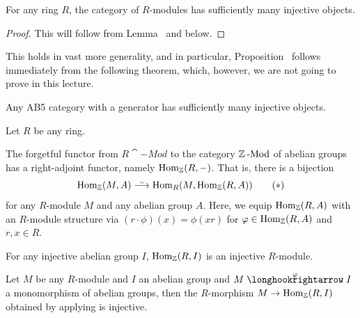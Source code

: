 \documentclass[a4paper,parskip=half,numbers=enddot, DIV=12]{scrreprt}
\begin{document}
\begin{prop}[a.k.a. ``Satz 2'']
	For any ring $R$, the category of $R$-modules has sufficiently many injective objects.
\end{prop}
\begin{proof}
	This will follow from Lemma~ and  below.
\end{proof}
\begin{rem*}
	This holds in vast more generality, and in particular, Proposition~ follows immediately from the following theorem, which, however, we are not going to prove in this lecture.
	\begin{thm*}[Grothendieck]
		Any AB5 category with a generator has sufficiently many injective objects.
	\end{thm*}
\end{rem*}
\begin{lem}
	Let $R$ be any ring.
	\begin{alphanumerate}
		\item The forgetful functor from $R\cat{-Mod}$ to the category $\mathbb{Z}\operatorname{-Mod}$ of abelian groups has a right-adjoint functor, namely $\operatorname{Hom}_{\mathbb{Z}}(R,-)$. That is, there is a bijection
		\begin{align}\lbl{eq:ForgetHomAdjunction}
			\Hom_\IZ(M,A)\isomorphism\Hom_R(M,\Hom_\IZ(R,A))\tag{$*$}
		\end{align}
		for any $R$-module $M$ and any abelian group $A$. Here, we equip $\operatorname{Hom}_{\mathbb{Z}}(R,A)$ with an $R$-module structure via $(r\cdot\phi)(x)=\phi(xr)$ for $\varphi\in\operatorname{Hom}_{\mathbb{Z}}(R,A)$ and $r,x\in R$.
		\item For any injective abelian group $I$, $\operatorname{Hom}_{\mathbb{Z}}(R,I)$ is an injective $R$-module.
		\item Let $M$ be any $R$-module and $I$ an abelian group and $M\monomorphism[\phi]I$ a monomorphism of abelian groups, then the $R$-morphism $M\morphism\Hom_\IZ(R,I)$ obtained by applying  is injective.
	\end{alphanumerate}
\end{lem}
\end{document}
